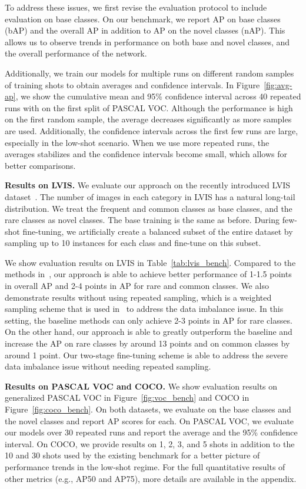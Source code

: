 \documentclass{article}
\newcommand\minisection[1]{\vspace{1mm}\noindent \textbf{#1}}
\begin{document}
To address these issues, we first revise the evaluation protocol to include evaluation on base classes. On our benchmark, we report AP on base classes (bAP) and the overall AP in addition to AP on the novel classes (nAP). This allows us to observe trends in performance on both base and novel classes, and the overall performance of the network.

Additionally, we train our models for multiple runs on different random samples of training shots to obtain averages and confidence intervals.
In Figure~\ref{fig:avg-ap}, we show the cumulative mean and 95\% confidence interval across 40 repeated runs with  on the first split of PASCAL VOC.
Although the performance is high on the first random sample, the average decreases significantly as more samples are used.
Additionally, the confidence intervals across the first few runs are large, especially in the low-shot scenario.
When we use more repeated runs, the averages stabilizes and the confidence intervals become small, which allows for better comparisons.



\minisection{Results on LVIS.}
We evaluate our approach on the recently introduced LVIS dataset~\cite{gupta2019lvis}. The number of images in each category in LVIS has a natural long-tail distribution. We treat the frequent and common classes as base classes, and the rare classes as novel classes.
The base training is the same as before.
During few-shot fine-tuning, we artificially create a balanced subset of the entire dataset by sampling up to 10 instances for each class and fine-tune on this subset.

We show evaluation results on LVIS in Table~\ref{tab:lvis_bench}.
Compared to the methods in~\citet{gupta2019lvis}, our approach is able to achieve better performance of 1-1.5 points in overall AP and 2-4 points in AP for rare and common classes.
We also demonstrate results without using repeated sampling, which is a weighted sampling scheme that is used in~\citet{gupta2019lvis} to address the data imbalance issue.
In this setting, the baseline methods can only achieve 2-3 points in AP for rare classes.
On the other hand, our approach is able to greatly outperform the baseline and increase the AP on rare classes by around 13 points and on common classes by around 1 point.
Our two-stage fine-tuning scheme is able to address the severe data imbalance issue without needing repeated sampling.

\vspace{3mm}
\minisection{Results on PASCAL VOC and COCO.}
We show evaluation results on generalized PASCAL VOC in Figure~\ref{fig:voc_bench} and COCO in Figure~\ref{fig:coco_bench}.
On both datasets, we evaluate on the base classes and the novel classes and report AP scores for each.
On PASCAL VOC, we evaluate our models over 30 repeated runs and report the average and the 95\% confidence interval.
On COCO, we provide results on 1, 2, 3, and 5 shots in addition to the 10 and 30 shots used by the existing benchmark for a better picture of performance trends in the low-shot regime. For the full quantitative results of other metrics (e.g., AP50 and AP75), more details are available in the appendix.
\end{document}
